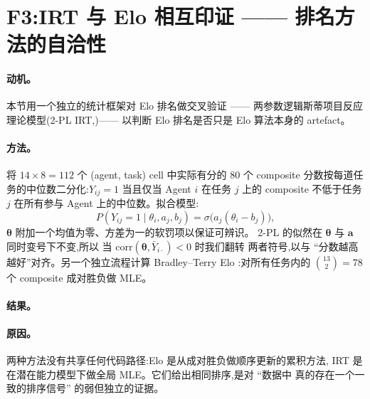 \documentclass[UTF8,11pt]{ctexart}
\begin{document}
\section{F3:IRT 与 Elo 相互印证 —— 排名方法的自洽性}
\label{sec:irt}

\paragraph{动机。}
本节用一个独立的统计框架对 Elo 排名做交叉验证 —— 两参数逻辑斯蒂项目反应
理论模型(2-PL IRT,\citep{lord-1980})—— 以判断 Elo 排名是否只是 Elo
算法本身的 artefact。

\paragraph{方法。}
将 $14 \times 8 = 112$ 个 (agent, task) cell 中实际有分的 80 个 composite
分数按每道任务的中位数二分化:$Y_{ij} = 1$ 当且仅当 Agent $i$ 在任务 $j$
上的 composite 不低于任务 $j$ 在所有参与 Agent 上的中位数。拟合模型:
\begin{equation}
  P(Y_{ij} = 1 \mid \theta_i, a_j, b_j) =
  \sigma\big( a_j (\theta_i - b_j) \big),
  \label{eq:2pl}
\end{equation}
$\boldsymbol\theta$ 附加一个均值为零、方差为一的软罚项以保证可辨识。
2-PL 的似然在 $\boldsymbol\theta$ 与 $\mathbf{a}$ 同时变号下不变,所以
当 $\mathrm{corr}(\boldsymbol\theta, \bar Y_{i\cdot}) < 0$ 时我们翻转
两者符号,以与 “分数越高越好”对齐。另一个独立流程计算
Bradley--Terry Elo \citep{bradley-terry-1952}:对所有任务内的
$\binom{13}{2}=78$ 个 composite 成对胜负做 MLE。

\paragraph{结果。}
\begin{table}[h]
  \centering
  \small
  
  \caption{Bradley--Terry Elo 与 IRT 2-PL 下的 Agent 能力估计。
    两种方法下的排序 Spearman $\rho = 1.00$($p < 10^{-3}$)。
    题目参数(表中未列):四道任务的 $a_j$ 全部抵到区分度上限 5,
    且 $b_j$ 聚集在 $\approx -0.33$。
    表格由 \texttt{data/results/arena\_elo\_ED.json} 与
    \texttt{data/results/irt\_calibration.json} 自动生成。}
  \label{tab:irt}
\end{table}

\paragraph{原因。}
两种方法没有共享任何代码路径:Elo 是从成对胜负做顺序更新的累积方法,
IRT 是在潜在能力模型下做全局 MLE。它们给出相同排序,是对 “数据中
真的存在一个一致的排序信号” 的弱但独立的证据。
\end{document}
